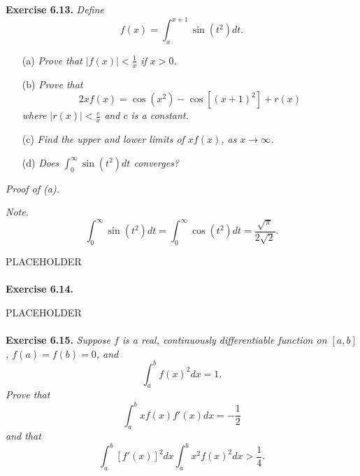 \documentclass{article}
\begin{document}



\textbf{Exercise 6.13.}
\emph{Define
\[
  f(x) = \int_{x}^{x+1} \sin(t^2)dt.
\]}
\begin{enumerate}
  \item[(a)]
  \emph{Prove that $|f(x)| < \frac{1}{x}$ if $x > 0$.}
  \item[(b)]
  \emph{Prove that
  \[
    2xf(x) = \cos(x^2) - \cos[(x+1)^2] + r(x)
  \]
  where $|r(x)| < \frac{c}{x}$ and $c$ is a constant.}
  \item[(c)]
  \emph{Find the upper and lower limits of $xf(x)$, as $x \to \infty$.}
  \item[(d)]
  \emph{Does $\int_{0}^{\infty} \sin(t^2)dt$ converges?} \\
\end{enumerate}

\emph{Proof of (a).}






\emph{Note.}
\[
  \int_{0}^{\infty} \sin(t^2)dt
  = \int_{0}^{\infty} \cos(t^2)dt
  = \frac{\sqrt{\pi}}{2\sqrt{2}}.
\]

PLACEHOLDER \\\\






\textbf{Exercise 6.14.}

PLACEHOLDER \\\\






\textbf{Exercise 6.15.}
\emph{Suppose $f$ is a real, continuously differentiable function on $[a,b]$,
$f(a)=f(b)=0$, and
\[
  \int_{a}^{b} f(x)^2 dx = 1.
\]
Prove that
\[
  \int_{a}^{b} xf(x)f'(x) dx = -\frac{1}{2}
\]
and that
\[
  \int_{a}^{b} [f'(x)]^2 dx \int_{a}^{b} x^2f(x)^2 dx > \frac{1}{4}.
\]
} \\
\end{document}
